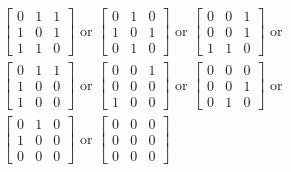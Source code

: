 \documentclass[letterpaper,10pt,english]{jupyterBook}
\begin{document}
\begin{align*}
&\begin{bmatrix}
    0 & 1 & 1 \\
    1 & 0 & 1 \\
    1 & 1 & 0
    \end{bmatrix}\textrm{ or }
\begin{bmatrix}
    0 & 1 & 0 \\
    1 & 0 & 1 \\
    0 & 1 & 0
    \end{bmatrix}\textrm{ or }
\begin{bmatrix}
    0 & 0 & 1 \\
    0 & 0 & 1 \\
    1 & 1 & 0
    \end{bmatrix}
    \textrm{ or }\\
&\begin{bmatrix}
    0 & 1 & 1 \\
    1 & 0 & 0 \\
    1 & 0 & 0
    \end{bmatrix}\textrm{ or }
\begin{bmatrix}
    0 & 0 & 1 \\
    0 & 0 & 0 \\
    1 & 0 & 0
    \end{bmatrix}\textrm{ or }
\begin{bmatrix}
    0 & 0 & 0 \\
    0 & 0 & 1 \\
    0 & 1 & 0
    \end{bmatrix}\textrm{ or }\\
&\begin{bmatrix}
    0 & 1 & 0 \\
    1 & 0 & 0 \\
    0 & 0 & 0
    \end{bmatrix}\textrm{ or }
\begin{bmatrix}
    0 & 0 & 0 \\
    0 & 0 & 0 \\
    0 & 0 & 0
    \end{bmatrix}
\end{align*}
\sphinxAtStartPar
\end{document}
